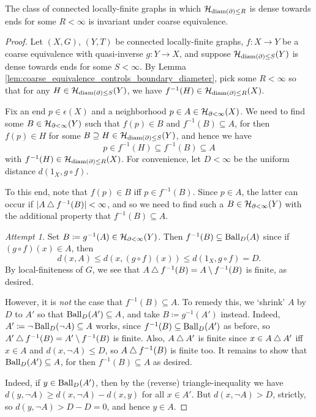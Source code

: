 \documentclass[reqno]{amsart}
\begin{document}
    \begin{proposition}\label{prp:invariant_of_density_coarse_equivalence}
        The class of connected locally-finite graphs in which $\mathcal{H}_{\operatorname{diam}(\partial)\leq R}$ is dense towards ends for some $R<\infty$ is invariant under coarse equivalence.
    \end{proposition}
    \begin{proof}
        Let $(X,G)$, $(Y,T)$ be connected locally-finite graphs, $f:X\to Y$ be a coarse equivalence with quasi-inverse $g:Y\to X$, and suppose $\mathcal{H}_{\operatorname{diam}(\partial)\leq S}(Y)$ is dense towards ends for some $S<\infty$. By Lemma \ref{lem:coarse_equivalence_controls_boundary_diameter}, pick some $R<\infty$ so that for any $H\in\mathcal{H}_{\operatorname{diam}(\partial)\leq S}(Y)$, we have $f^{-1}(H)\in\mathcal{H}_{\operatorname{diam}(\partial)\leq R}(X)$.

        Fix an end $p\in\epsilon(X)$ and a neighborhood $p\in A\in\mathcal{H}_{\partial<\infty}(X)$. We need to find some $B\in\mathcal{H}_{\partial<\infty}(Y)$ such that $f(p)\in B$ and $f^{-1}(B)\subseteq A$, for then $f(p)\in H$ for some $B\supseteq H\in\mathcal{H}_{\operatorname{diam}(\partial)\leq S}(Y)$, and hence we have
        \begin{equation*}
            p\in f^{-1}(H)\subseteq f^{-1}(B)\subseteq A
        \end{equation*}
        with $f^{-1}(H)\in\mathcal{H}_{\operatorname{diam}(\partial)\leq R}(X)$. For convenience, let $D<\infty$ be the uniform distance $d(1_X,g\circ f)$.

        To this end, note that $f(p)\in B$ iff $p\in f^{-1}(B)$. Since $p\in A$, the latter can occur if $|A\bigtriangleup f^{-1}(B)|<\infty$, and so we need to find such a $B\in\mathcal{H}_{\partial<\infty}(Y)$ with the additional property that $f^{-1}(B)\subseteq A$.
        \begin{leftbar}
        \textit{Attempt 1.} Set $B\coloneqq g^{-1}(A)\in\mathcal{H}_{\partial<\infty}(Y)$. Then $f^{-1}(B)\subseteq\operatorname{Ball}_D(A)$ since if $(g\circ f)(x)\in A$, then
                \begin{equation*}
                    d(x,A)\leq d(x,(g\circ f)(x))\leq d(1_X,g\circ f)=D.
                \end{equation*}
            By local-finiteness of $G$, we see that $A\bigtriangleup f^{-1}(B)=A\setminus f^{-1}(B)$ is finite, as desired.
        \end{leftbar}
        However, it is \textit{not} the case that $f^{-1}(B)\subseteq A$. To remedy this, we `shrink' $A$ by $D$ to $A'$ so that $\operatorname{Ball}_D(A')\subseteq A$, and take $B\coloneqq g^{-1}(A')$ instead. Indeed, $A'\coloneqq\lnot\operatorname{Ball}_D(\lnot A)\subseteq A$ works, since $f^{-1}(B)\subseteq\operatorname{Ball}_D(A')$ as before, so $A'\bigtriangleup f^{-1}(B)=A'\setminus f^{-1}(B)$ is finite. Also, $A\bigtriangleup A'$ is finite since $x\in A\bigtriangleup A'$ iff $x\in A$ and $d(x,\lnot A)\leq D$, so $A\bigtriangleup f^{-1}(B)$ is finite too. It remains to show that $\operatorname{Ball}_D(A')\subseteq A$, for then $f^{-1}(B)\subseteq A$ as desired.

        Indeed, if $y\in\operatorname{Ball}_D(A')$, then by the (reverse) triangle-inequality we have $d(y,\lnot A)\geq d(x,\lnot A)-d(x,y)$ for all $x\in A'$. But $d(x,\lnot A)>D$, strictly, so $d(y,\lnot A)>D-D=0$, and hence $y\in A$.
    \end{proof}
\end{document}
